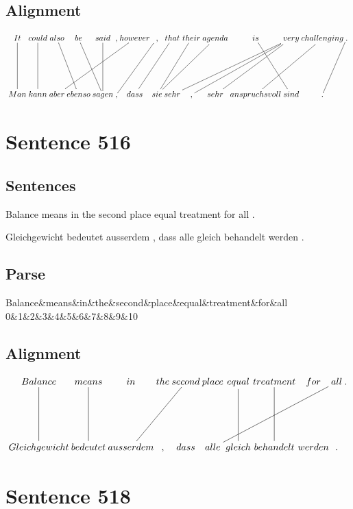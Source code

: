 \documentclass{report}
\begin{document}
\subsection*{Alignment}
\scriptsize{
$
\xymatrix@C-2.3pc{
It \ar @{-} [dd] & could \ar @{-} [dd] & also \ar @{-} [ddr] & be \ar @{-} [ddr] & said \ar @{-} [dd] & , & however \ar @{-} [ddllll] & , \ar @{-} [ddll] & that \ar @{-} [ddll] & their \ar @{-} [ddll] & agenda \ar @{-} [ddlll] & is \ar @{-} [ddr] & very \ar @{-} [ddlll] \ar @{-} [ddll] \ar @{-} [ddllll] & challenging \ar @{-} [ddll] & . \ar @{-} [ddl]\\\\
Man & kann & aber & ebenso & sagen & , & dass & sie & sehr & , & sehr & anspruchsvoll & sind & .
}$}
\newpage\section*{Sentence 516}

\subsection*{Sentences}
Balance means in the second place equal treatment for all .

\noindent Gleichgewicht bedeutet ausserdem , dass alle gleich behandelt werden .



\subsection*{Parse}
\begin{dependency}[theme=simple]
\begin{deptext}[column sep=.5cm, row sep=.1ex]
Balance\&means\&in\&the\&second\&place\&equal\&treatment\&for\&all\\
0\&1\&2\&3\&4\&5\&6\&7\&8\&9\&10\\
\end{deptext}
\end{dependency}


\subsection*{Alignment}
\scriptsize{
$
\xymatrix@C-2.3pc{
Balance \ar @{-} [dd] & means \ar @{-} [dd] & in & the & second \ar @{-} [ddll] & place & equal \ar @{-} [dd] & treatment \ar @{-} [dd] & for & all \ar @{-} [ddllll] & .\\\\
Gleichgewicht & bedeutet & ausserdem & , & dass & alle & gleich & behandelt & werden & .
}$}
\newpage\section*{Sentence 518}
\end{document}
